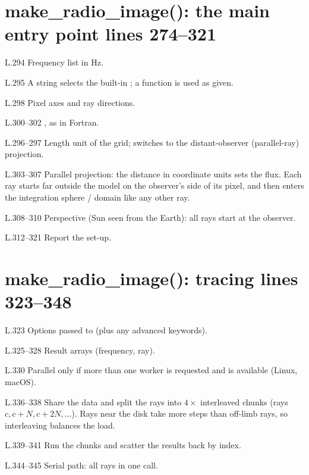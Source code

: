 \section*{\normalsize make\_radio\_image(): the main entry point \hfill{\small\mdseries\color{gray}lines 274--321}}

\begin{lines}
\item[L.294] Frequency list in Hz.
\item[L.295] A string selects the built-in ; a function is used as given.
\item[L.298] Pixel axes and ray directions.
\item[L.300–302] , as in Fortran.
\item[L.296–297] Length unit of the grid;  switches to the distant-observer (parallel-ray) projection.
\item[L.303–307] Parallel projection: the distance in coordinate units sets the flux. Each ray starts far outside the model on the observer's side of its pixel, and then enters the integration sphere / domain like any other ray.
\item[L.308–310] Perspective (Sun seen from the Earth): all rays start at the observer.
\item[L.312–321] Report the set-up.
\end{lines}
\section*{\normalsize make\_radio\_image(): tracing \hfill{\small\mdseries\color{gray}lines 323--348}}

\begin{lines}
\item[L.323] Options passed to  (plus any advanced keywords).
\item[L.325–328] Result arrays (frequency, ray).
\item[L.330] Parallel only if more than one worker is requested and  is available (Linux, macOS).
\item[L.336–338] Share the data and split the rays into $4\times$  interleaved chunks (rays $c, c+N, c+2N, \ldots$). Rays near the disk take more steps than off-limb rays, so interleaving balances the load.
\item[L.339–341] Run the chunks and scatter the results back by index.
\item[L.344–345] Serial path: all rays in one call.
\end{lines}
